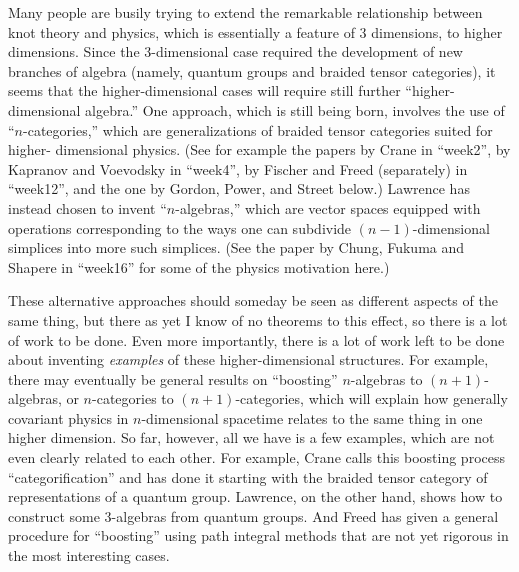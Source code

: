 \documentclass{article}
\renewcommand{\texttt}[1]{%
  \begingroup
  \ttfamily
  \begingroup\lccode`~=`/\lowercase{\endgroup\def~}{/\discretionary{}{}{}}%
  \begingroup\lccode`~=`[\lowercase{\endgroup\def~}{[\discretionary{}{}{}}%
  \begingroup\lccode`~=`.\lowercase{\endgroup\def~}{.\discretionary{}{}{}}%
  \catcode`/=\active\catcode`[=\active\catcode`.=\active
  \scantokens{#1\noexpand}%
  \endgroup
}
\begin{document}

Many people are busily trying to extend the remarkable relationship
between knot theory and physics, which is essentially a feature of 3
dimensions, to higher dimensions. Since the 3-dimensional case required
the development of new branches of algebra (namely, quantum groups and
braided tensor categories), it seems that the higher-dimensional cases
will require still further ``higher-dimensional algebra.'' One approach,
which is still being born, involves the use of ``\(n\)-categories,''
which are generalizations of braided tensor categories suited for
higher- dimensional physics. (See for example the papers by Crane in
``week2'', by Kapranov and Voevodsky in ``week4'', by Fischer and Freed
(separately) in ``week12'', and the one by Gordon, Power, and Street
below.) Lawrence has instead chosen to invent ``\(n\)-algebras,'' which
are vector spaces equipped with operations corresponding to the ways one
can subdivide \((n-1)\)-dimensional simplices into more such simplices.
(See the paper by Chung, Fukuma and Shapere in ``week16'' for some of
the physics motivation here.)

These alternative approaches should someday be seen as different aspects
of the same thing, but there as yet I know of no theorems to this
effect, so there is a lot of work to be done. Even more importantly,
there is a lot of work left to be done about inventing \emph{examples}
of these higher-dimensional structures. For example, there may
eventually be general results on ``boosting'' \(n\)-algebras to
\((n+1)\)-algebras, or \(n\)-categories to \((n+1)\)-categories, which
will explain how generally covariant physics in \(n\)-dimensional
spacetime relates to the same thing in one higher dimension. So far,
however, all we have is a few examples, which are not even clearly
related to each other. For example, Crane calls this boosting process
``categorification'' and has done it starting with the braided tensor
category of representations of a quantum group. Lawrence, on the other
hand, shows how to construct some 3-algebras from quantum groups. And
Freed has given a general procedure for ``boosting'' using path integral
methods that are not yet rigorous in the most interesting cases.
\end{document}
